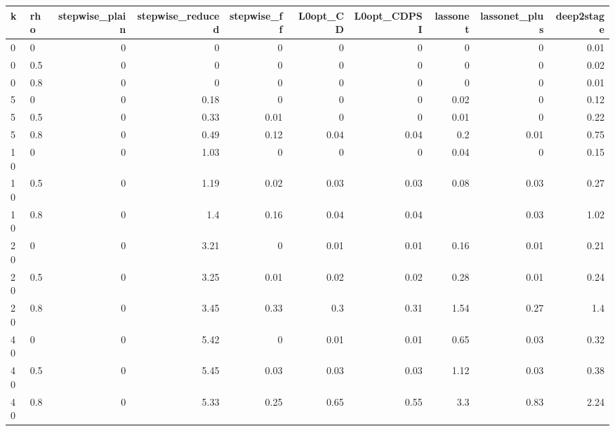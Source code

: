 \begin{tabular}{llrrrrrrrr}
\toprule
k & rho & stepwise\_plain & stepwise\_reduced & stepwise\_ff & L0opt\_CD & L0opt\_CDPSI & lassonet & lassonet\_plus & deep2stage \\
\midrule
0 & 0 & 0 & 0 & 0 & 0 & 0 & 0 & 0 & 0.01 \\
0 & 0.5 & 0 & 0 & 0 & 0 & 0 & 0 & 0 & 0.02 \\
0 & 0.8 & 0 & 0 & 0 & 0 & 0 & 0 & 0 & 0.01 \\
5 & 0 & 0 & 0.18 & 0 & 0 & 0 & 0.02 & 0 & 0.12 \\
5 & 0.5 & 0 & 0.33 & 0.01 & 0 & 0 & 0.01 & 0 & 0.22 \\
5 & 0.8 & 0 & 0.49 & 0.12 & 0.04 & 0.04 & 0.2 & 0.01 & 0.75 \\
10 & 0 & 0 & 1.03 & 0 & 0 & 0 & 0.04 & 0 & 0.15 \\
10 & 0.5 & 0 & 1.19 & 0.02 & 0.03 & 0.03 & 0.08 & 0.03 & 0.27 \\
10 & 0.8 & 0 & 1.4 & 0.16 & 0.04 & 0.04 &  & 0.03 & 1.02 \\
20 & 0 & 0 & 3.21 & 0 & 0.01 & 0.01 & 0.16 & 0.01 & 0.21 \\
20 & 0.5 & 0 & 3.25 & 0.01 & 0.02 & 0.02 & 0.28 & 0.01 & 0.24 \\
20 & 0.8 & 0 & 3.45 & 0.33 & 0.3 & 0.31 & 1.54 & 0.27 & 1.4 \\
40 & 0 & 0 & 5.42 & 0 & 0.01 & 0.01 & 0.65 & 0.03 & 0.32 \\
40 & 0.5 & 0 & 5.45 & 0.03 & 0.03 & 0.03 & 1.12 & 0.03 & 0.38 \\
40 & 0.8 & 0 & 5.33 & 0.25 & 0.65 & 0.55 & 3.3 & 0.83 & 2.24 \\
\bottomrule
\end{tabular}
